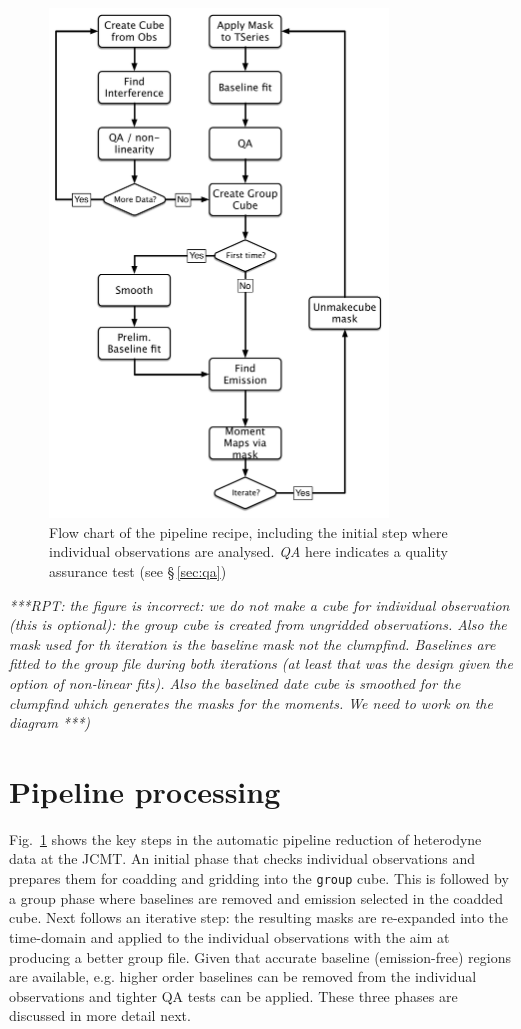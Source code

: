 \documentclass[final,authoryear,5p,times,twocolumn]{elsarticle}
\begin{document}
\begin{figure}
\includegraphics[width=90mm]{flowchart}
\caption{Flow chart of the pipeline recipe, including the initial step
  where individual observations are analysed. \emph{QA} here indicates
a quality assurance test (see \S\,\ref{sec:qa})}
\label{fig:flowchart}
\end{figure}

\textit{\color{red} ***RPT: the figure is incorrect: we do not make a cube for individual observation
 (this is optional): the group cube is created from ungridded observations. Also the mask used
  for th iteration is the baseline mask not the clumpfind. Baselines are fitted to the group
  file during both iterations (at least that was the design given the option of non-linear fits).
  Also the baselined date cube is smoothed for the clumpfind which generates the masks
  for the moments.  We need to work on the diagram  ***)}

\section{Pipeline processing}

Fig.\ \ref{fig:flowchart} shows the key steps in the automatic
pipeline reduction of heterodyne data at the JCMT. An initial phase
that checks individual observations and prepares them for coadding and
gridding into the \texttt{group} cube. This is followed by a group
phase where baselines are removed and emission selected in the coadded
cube.  Next follows an iterative step: the resulting masks are
re-expanded into the time-domain and applied to the individual
observations with the aim at producing a better group file. Given that
accurate baseline (emission-free) regions are available, e.g. higher
order baselines can be removed from the individual observations and
tighter QA tests can be applied. These three phases are discussed in
more detail next.
\end{document}
